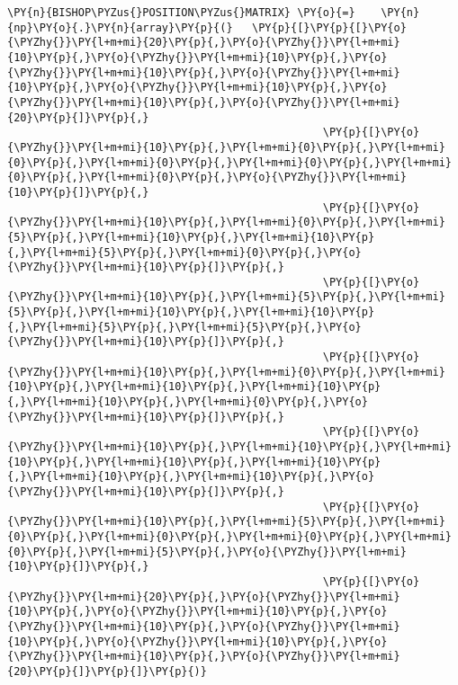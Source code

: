 \begin{Verbatim}[commandchars=\\\{\}]
         \PY{n}{BISHOP\PYZus{}POSITION\PYZus{}MATRIX} \PY{o}{=}    \PY{n}{np}\PY{o}{.}\PY{n}{array}\PY{p}{(}   \PY{p}{[}\PY{p}{[}\PY{o}{\PYZhy{}}\PY{l+m+mi}{20}\PY{p}{,}\PY{o}{\PYZhy{}}\PY{l+m+mi}{10}\PY{p}{,}\PY{o}{\PYZhy{}}\PY{l+m+mi}{10}\PY{p}{,}\PY{o}{\PYZhy{}}\PY{l+m+mi}{10}\PY{p}{,}\PY{o}{\PYZhy{}}\PY{l+m+mi}{10}\PY{p}{,}\PY{o}{\PYZhy{}}\PY{l+m+mi}{10}\PY{p}{,}\PY{o}{\PYZhy{}}\PY{l+m+mi}{10}\PY{p}{,}\PY{o}{\PYZhy{}}\PY{l+m+mi}{20}\PY{p}{]}\PY{p}{,}
                                                 \PY{p}{[}\PY{o}{\PYZhy{}}\PY{l+m+mi}{10}\PY{p}{,}\PY{l+m+mi}{0}\PY{p}{,}\PY{l+m+mi}{0}\PY{p}{,}\PY{l+m+mi}{0}\PY{p}{,}\PY{l+m+mi}{0}\PY{p}{,}\PY{l+m+mi}{0}\PY{p}{,}\PY{l+m+mi}{0}\PY{p}{,}\PY{o}{\PYZhy{}}\PY{l+m+mi}{10}\PY{p}{]}\PY{p}{,}
                                                 \PY{p}{[}\PY{o}{\PYZhy{}}\PY{l+m+mi}{10}\PY{p}{,}\PY{l+m+mi}{0}\PY{p}{,}\PY{l+m+mi}{5}\PY{p}{,}\PY{l+m+mi}{10}\PY{p}{,}\PY{l+m+mi}{10}\PY{p}{,}\PY{l+m+mi}{5}\PY{p}{,}\PY{l+m+mi}{0}\PY{p}{,}\PY{o}{\PYZhy{}}\PY{l+m+mi}{10}\PY{p}{]}\PY{p}{,}
                                                 \PY{p}{[}\PY{o}{\PYZhy{}}\PY{l+m+mi}{10}\PY{p}{,}\PY{l+m+mi}{5}\PY{p}{,}\PY{l+m+mi}{5}\PY{p}{,}\PY{l+m+mi}{10}\PY{p}{,}\PY{l+m+mi}{10}\PY{p}{,}\PY{l+m+mi}{5}\PY{p}{,}\PY{l+m+mi}{5}\PY{p}{,}\PY{o}{\PYZhy{}}\PY{l+m+mi}{10}\PY{p}{]}\PY{p}{,}
                                                 \PY{p}{[}\PY{o}{\PYZhy{}}\PY{l+m+mi}{10}\PY{p}{,}\PY{l+m+mi}{0}\PY{p}{,}\PY{l+m+mi}{10}\PY{p}{,}\PY{l+m+mi}{10}\PY{p}{,}\PY{l+m+mi}{10}\PY{p}{,}\PY{l+m+mi}{10}\PY{p}{,}\PY{l+m+mi}{0}\PY{p}{,}\PY{o}{\PYZhy{}}\PY{l+m+mi}{10}\PY{p}{]}\PY{p}{,}
                                                 \PY{p}{[}\PY{o}{\PYZhy{}}\PY{l+m+mi}{10}\PY{p}{,}\PY{l+m+mi}{10}\PY{p}{,}\PY{l+m+mi}{10}\PY{p}{,}\PY{l+m+mi}{10}\PY{p}{,}\PY{l+m+mi}{10}\PY{p}{,}\PY{l+m+mi}{10}\PY{p}{,}\PY{l+m+mi}{10}\PY{p}{,}\PY{o}{\PYZhy{}}\PY{l+m+mi}{10}\PY{p}{]}\PY{p}{,}
                                                 \PY{p}{[}\PY{o}{\PYZhy{}}\PY{l+m+mi}{10}\PY{p}{,}\PY{l+m+mi}{5}\PY{p}{,}\PY{l+m+mi}{0}\PY{p}{,}\PY{l+m+mi}{0}\PY{p}{,}\PY{l+m+mi}{0}\PY{p}{,}\PY{l+m+mi}{0}\PY{p}{,}\PY{l+m+mi}{5}\PY{p}{,}\PY{o}{\PYZhy{}}\PY{l+m+mi}{10}\PY{p}{]}\PY{p}{,}
                                                 \PY{p}{[}\PY{o}{\PYZhy{}}\PY{l+m+mi}{20}\PY{p}{,}\PY{o}{\PYZhy{}}\PY{l+m+mi}{10}\PY{p}{,}\PY{o}{\PYZhy{}}\PY{l+m+mi}{10}\PY{p}{,}\PY{o}{\PYZhy{}}\PY{l+m+mi}{10}\PY{p}{,}\PY{o}{\PYZhy{}}\PY{l+m+mi}{10}\PY{p}{,}\PY{o}{\PYZhy{}}\PY{l+m+mi}{10}\PY{p}{,}\PY{o}{\PYZhy{}}\PY{l+m+mi}{10}\PY{p}{,}\PY{o}{\PYZhy{}}\PY{l+m+mi}{20}\PY{p}{]}\PY{p}{]}\PY{p}{)}
         

\end{Verbatim}
